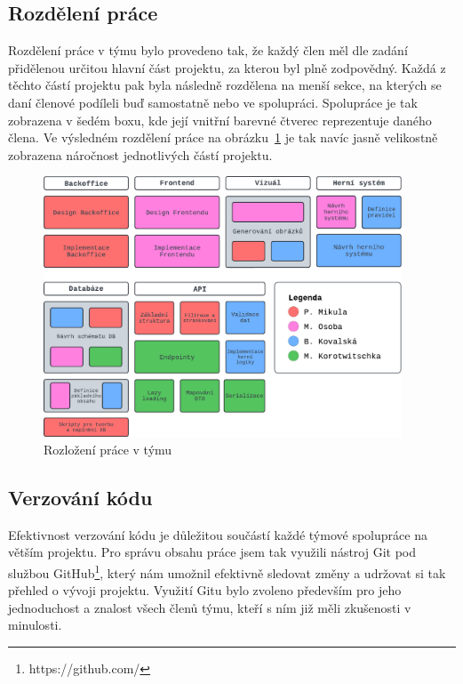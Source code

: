 \subsection{Rozdělení práce}
\label{subsec:implementation-collaboration-distribution}
Rozdělení práce v týmu bylo provedeno tak, že každý člen měl dle zadání přidělenou určitou hlavní část projektu, za kterou byl plně zodpovědný. Každá z těchto částí projektu pak byla následně rozdělena na menší sekce, na kterých se daní členové podíleli buď samostatně nebo ve spolupráci. Spolupráce je tak zobrazena v šedém boxu, kde její vnitřní barevné čtverec reprezentuje daného člena. Ve výsledném rozdělení práce na obrázku~\ref{fig:job_distribution} je tak navíc jasně velikostně zobrazena náročnost jednotlivých částí projektu.

\begin{figure}[H]
    \centering
    \includegraphics[width=0.95\textwidth]{../../shared/diagrams/blocks}
    \caption{Rozložení práce v týmu}
    \label{fig:job_distribution}
\end{figure}

\subsection{Verzování kódu}
\label{subsec:implementation-collaboration-versioning}
Efektivnost verzování kódu je důležitou součástí každé týmové spolupráce na větším projektu. Pro správu obsahu práce jsem tak využili nástroj Git pod službou GitHub\footnote{https://github.com/}, který nám umožnil efektivně sledovat změny a udržovat si tak přehled o vývoji projektu. Využití Gitu bylo zvoleno především pro jeho jednoduchost a znalost všech členů týmu, kteří s ním již měli zkušenosti v minulosti.

